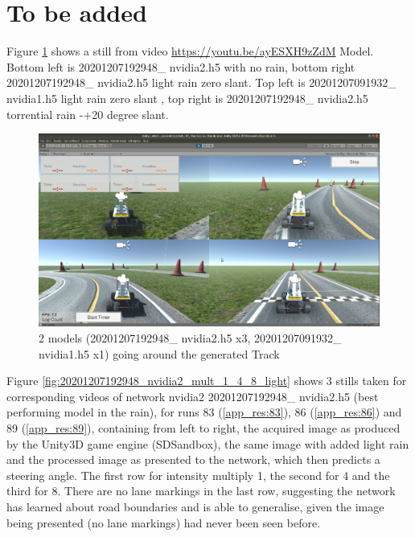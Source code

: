 \section{To be added}

Figure  \ref{fig:2948x3_1932x1_genTrack}  shows a still from video \url{https://youtu.be/ayESXH9zZdM} Model.
Bottom left is 20201207192948\_ nvidia2.h5 with no rain, bottom right 20201207192948\_ nvidia2.h5 light rain zero slant. Top left is 20201207091932\_ nvidia1.h5 light rain zero slant , top right is 20201207192948\_ nvidia2.h5 torrential rain -+20 degree slant.

\begin{figure}[ht]
 \centering 
 \includegraphics[width=\textwidth]{Figures/2948x3_1932x1_genTrack.png}
 \caption{2 models (20201207192948\_ nvidia2.h5 x3, 20201207091932\_ nvidia1.h5 x1) going around the generated Track}
 \label{fig:2948x3_1932x1_genTrack} 
\end{figure}

Figure \ref{fig:20201207192948_nvidia2_mult_1_4_8_light} shows 3 stills taken for corresponding videos of network nvidia2 20201207192948\_ nvidia2.h5 (best performing model in the rain), for runs 83 (\ref{app_res:83}), 86 (\ref{app_res:86}) and 89 (\ref{app_res:89}), containing from left to right, the acquired image as produced by the Unity3D game engine (SDSandbox), the same image with added light rain and the processed image as presented to the network, which then predicts a steering angle. The first row for intensity multiply 1, the second for 4 and the third for 8. There are no lane markings in the last row, suggesting the network has learned about road boundaries and is able to generalise, given the image being presented (no lane markings) had never been seen before.

